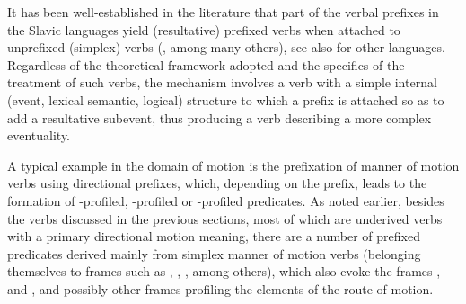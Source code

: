 \documentclass[output=paper,colorlinks,citecolor=brown]{langscibook}
\begin{document}
It has been well-established in the literature that part of the verbal prefixes in the Slavic languages yield (resultative) prefixed verbs when attached to unprefixed (simplex) verbs (\cite{Beavers2010,Pantcheva-2007,Pantcheva2007,Pantcheva2011, Palmer2009,SpencerZaretskaya1998,Svenonius2005}, among many others), see also \citet[178--184]{VanValinLaPolla1997} for other languages. Regardless of the theoretical framework adopted and the specifics of the treatment of such verbs, the mechanism involves a verb with a simple internal (event, lexical semantic, logical) structure to which a prefix is attached so as to add a resultative subevent, thus producing a verb describing a more complex eventuality. 

A typical example in the domain of motion is the prefixation of manner of motion verbs using directional prefixes, which, depending on the prefix, leads to the formation of -profiled, -profiled or -profiled predicates. As noted earlier, besides the verbs discussed in the previous sections, most of which are underived verbs with a primary directional motion meaning, there are a number of prefixed predicates derived mainly from simplex manner of motion verbs (belonging themselves to frames such as , , , among others), which also evoke the frames ,  and , and possibly other frames profiling the elements of the route of motion. 
\end{document}
